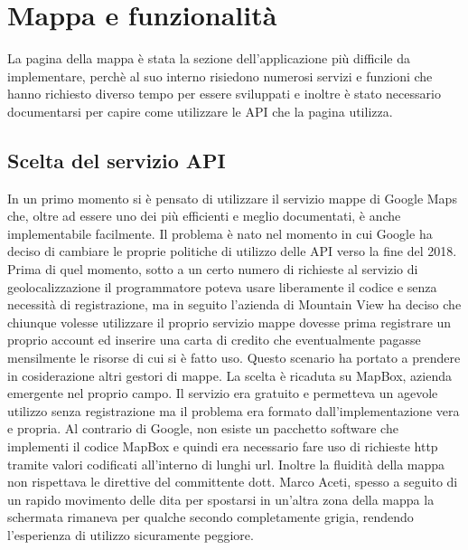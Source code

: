 \chapter{Mappa e funzionalità}
La pagina della mappa è stata la sezione dell'applicazione più difficile da
implementare, perchè al suo interno risiedono numerosi servizi e funzioni che
hanno richiesto diverso tempo per essere sviluppati e inoltre è stato necessario
documentarsi per capire come utilizzare le API che la pagina utilizza.

\section{Scelta del servizio API}
In un primo momento si è pensato di utilizzare il servizio mappe di Google Maps
che, oltre ad essere uno dei più efficienti e meglio documentati, è anche
implementabile facilmente. Il problema è nato nel momento in cui Google ha
deciso di cambiare le proprie politiche di utilizzo delle API verso la fine del
2018. Prima di quel momento, sotto a un certo numero di richieste al servizio di
geolocalizzazione il programmatore poteva usare liberamente il codice e senza
necessità di registrazione, ma in seguito l'azienda di Mountain View ha deciso
che chiunque volesse utilizzare il proprio servizio mappe dovesse prima
registrare un proprio account ed inserire una carta di credito che eventualmente
pagasse mensilmente le risorse di cui si è fatto uso. Questo scenario ha portato
a prendere in cosiderazione altri gestori di mappe. La scelta è ricaduta su
MapBox, azienda emergente nel proprio campo. Il servizio era gratuito e permetteva
un agevole utilizzo senza registrazione ma il problema era formato
dall'implementazione vera e propria. Al contrario di Google, non esiste un
pacchetto software che implementi il codice MapBox e quindi era necessario fare
uso di richieste http tramite valori codificati all'interno di lunghi url.
Inoltre la fluidità della mappa non rispettava le direttive del committente
dott. Marco Aceti, spesso a seguito di un rapido movimento delle dita per
spostarsi in un'altra zona della mappa la schermata rimaneva per qualche secondo
completamente grigia, rendendo l'esperienza di utilizzo sicuramente peggiore.

